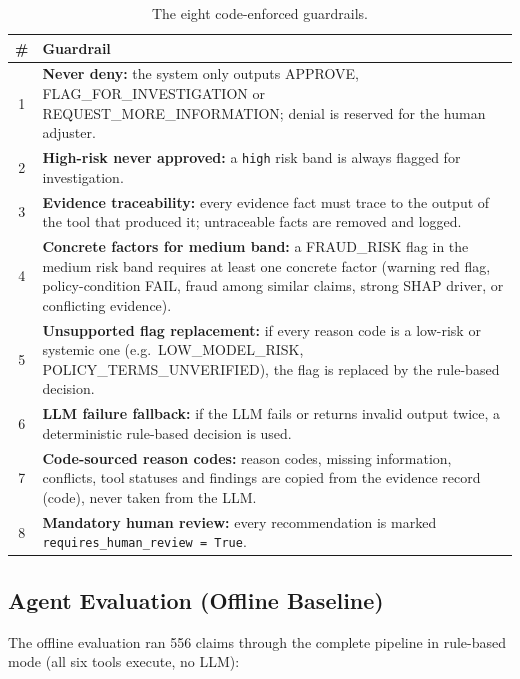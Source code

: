 \documentclass[12pt,a4paper]{article}
\begin{document}
\begin{table}[H]
\centering
\caption{The eight code-enforced guardrails.}
\label{tab:guardrails}
\begin{tabular}{@{}cp{12cm}@{}}
\toprule
\textbf{\#} & \textbf{Guardrail} \\
\midrule
1 & \textbf{Never deny:} the system only outputs APPROVE, FLAG\_FOR\_INVESTIGATION or REQUEST\_MORE\_INFORMATION; denial is reserved for the human adjuster. \\
2 & \textbf{High-risk never approved:} a \texttt{high} risk band is always flagged for investigation. \\
3 & \textbf{Evidence traceability:} every evidence fact must trace to the output of the tool that produced it; untraceable facts are removed and logged. \\
4 & \textbf{Concrete factors for medium band:} a FRAUD\_RISK flag in the medium risk band requires at least one concrete factor (warning red flag, policy-condition FAIL, fraud among similar claims, strong SHAP driver, or conflicting evidence). \\
5 & \textbf{Unsupported flag replacement:} if every reason code is a low-risk or systemic one (e.g.\ LOW\_MODEL\_RISK, POLICY\_TERMS\_UNVERIFIED), the flag is replaced by the rule-based decision. \\
6 & \textbf{LLM failure fallback:} if the LLM fails or returns invalid output twice, a deterministic rule-based decision is used. \\
7 & \textbf{Code-sourced reason codes:} reason codes, missing information, conflicts, tool statuses and findings are copied from the evidence record (code), never taken from the LLM. \\
8 & \textbf{Mandatory human review:} every recommendation is marked \texttt{requires\_human\_review = True}. \\
\bottomrule
\end{tabular}
\end{table}

\subsection{Agent Evaluation (Offline Baseline)}

The offline evaluation ran 556 claims through the complete pipeline in rule-based mode (all six tools execute, no LLM):
\end{document}
